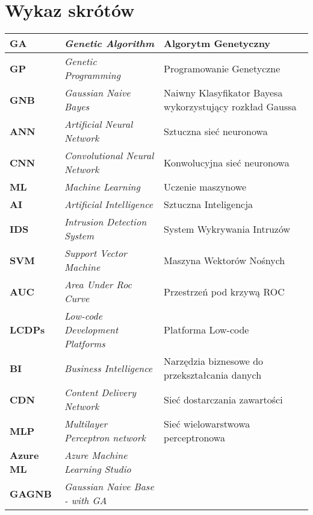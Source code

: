 \section*{Wykaz skrótów}

\begin{table}[H]
    \centering
    \begin{tabularx}{\linewidth}{lXX}
        \textbf{GA} & \textit{Genetic Algorithm} & Algorytm Genetyczny \\ \hline
        \textbf{GP} & \textit{Genetic Programming} & Programowanie Genetyczne \\ \hline
        \textbf{GNB} & \textit{Gaussian Naive Bayes} & Naiwny Klasyfikator Bayesa wykorzystujący rozkład Gaussa \\ \hline
        \textbf{ANN} & \textit{Artificial Neural Network} & Sztuczna sieć neuronowa \\ \hline
        \textbf{CNN} & \textit{Convolutional Neural Network} & Konwolucyjna sieć neuronowa \\ \hline
        \textbf{ML} & \textit{Machine Learning} & Uczenie maszynowe \\ \hline
        \textbf{AI} & \textit{Artificial Intelligence} & Sztuczna Inteligencja \\ \hline
        \textbf{IDS} & \textit{Intrusion Detection System} & System Wykrywania Intruzów \\ \hline
        \textbf{SVM} & \textit{Support Vector Machine} & Maszyna Wektorów Nośnych \\ \hline
        \textbf{AUC} & \textit{Area Under Roc Curve} & Przestrzeń pod krzywą ROC \\ \hline
        \textbf{LCDPs} & \textit{Low-code Development Platforms} & Platforma Low-code \\ \hline
        \textbf{BI} & \textit{Business Intelligence} & Narzędzia biznesowe do przekształcania danych \\ \hline
        \textbf{CDN} & \textit{Content Delivery Network} & Sieć dostarczania zawartości \\ \hline
        \textbf{MLP} & \textit{Multilayer Perceptron network} & Sieć wielowarstwowa perceptronowa \\ \hline
        \textbf{Azure ML} & \textit{Azure Machine Learning Studio} & \\
        \textbf{GAGNB} & \textit{Gaussian Naive Base - with GA} & \\
    \end{tabularx}
    \label{tab:shorts}
\end{table}
